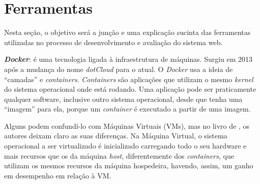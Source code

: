 % 
% 


\hspace{2.5cm}
\section{Ferramentas}
\label{sec:ferramentas}

\hspace{2.5cm}

Nesta seção, o objetivo será a junção e uma explicação sucinta das ferramentas utilizadas no processo de desenvolvimento e avaliação do sistema web.  




%  

\textbf{\textit{Docker}}: é uma tecnologia ligada à infraestrutura de máquinas. Surgiu em 2013 após a mudança do nome \textit{dotCloud} para o atual. O \textit{Docker} usa a ideia de ``camadas'' e \textit{containers}. \textit{Containers} são aplicações que utilizam o mesmo \textit{kernel} do sistema operacional onde está rodando. Uma aplicação pode ser praticamente qualquer software, inclusive outro sistema operacional, desde que tenha uma ``imagem'' para ela, porque um \textit{container} é executado a partir de uma imagem.

Alguns podem confundí-lo com Máquinas Virtuais (VMs), mas no livro de , os autores deixam claro as suas diferenças. Na Máquina Virtual, o sistema operacional a ser virtualizado é inicializado carregando todo o seu hardware e mais recursos que os da máquina \textit{host}, diferentemente dos \textit{containers}, que utilizam os mesmos recursos da máquina hospedeira, havendo, assim, um ganho em desempenho em relação à VM.

